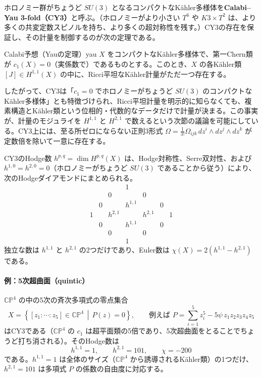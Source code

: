\documentclass[uplatex, dvipdfmx, book]{jsbook}
\begin{document}
ホロノミー群がちょうど $SU(3)$ となるコンパクトなK\"ahler多様体を\textbf{Calabi--Yau 3-fold（CY3）}と呼ぶ。（ホロノミーがより小さい $T^6$ や $K3 \times T^2$ は、より多くの共変定数スピノルを持ち、より多くの超対称性を残す。）CY3の存在を保証し、その計量を制御するのが次の定理である\cite{yau1978}。

\begin{mythm}{Calabi予想（Yauの定理）}{yau}
$X$ をコンパクトなK\"ahler多様体で、第一Chern類が $c_1(X) = 0$（実係数で）であるものとする。このとき、$X$ の各K\"ahler類 $[J] \in H^{1,1}(X)$ の中に、Ricci平坦なK\"ahler計量がただ一つ存在する。
\end{mythm}

したがって、CY3は「$c_1 = 0$ でホロノミーがちょうど $SU(3)$ のコンパクトなK\"ahler多様体」とも特徴づけられ、Ricci平坦計量を明示的に知らなくても、複素構造とK\"ahler類という位相的・代数的なデータだけで計量が決まる。この事実が、計量のモジュライを $H^{1,1}$ と $H^{2,1}$ で数えるという次節の議論を可能にしている。CY3上には、至る所ゼロにならない正則3形式 $\Omega = \frac{1}{3!}\Omega_{ijk}\, dz^i \wedge dz^j \wedge dz^k$ が定数倍を除いて一意に存在する。

CY3のHodge数 $h^{p,q} = \dim H^{p,q}(X)$ は、Hodge対称性、Serre双対性、および $h^{1,0} = h^{2,0} = 0$（ホロノミーがちょうど $SU(3)$ であることから従う）により、次のHodgeダイアモンドにまとめられる。
\begin{equation}
\begin{array}{ccccccc}
 & & & 1 & & & \\
 & & 0 & & 0 & & \\
 & 0 & & h^{1,1} & & 0 & \\
 1 & & h^{2,1} & & h^{2,1} & & 1 \\
 & 0 & & h^{1,1} & & 0 & \\
 & & 0 & & 0 & & \\
 & & & 1 & & &
\end{array}
\end{equation}
独立な数は $h^{1,1}$ と $h^{2,1}$ の2つだけであり、Euler数は $\chi(X) = 2(h^{1,1} - h^{2,1})$ である。

\paragraph{例：5次超曲面（quintic）}
$\mathbb{CP}^4$ の中の5次の斉次多項式の零点集合
\begin{equation}
    X = \left\{ [z_1 : \cdots : z_5] \in \mathbb{CP}^4 \,\middle|\, P(z) = 0 \right\}, \qquad \text{例えば } P = \sum_{i=1}^5 z_i^5 - 5\psi\, z_1z_2z_3z_4z_5
\end{equation}
はCY3である（$\mathbb{CP}^4$ の $c_1$ は超平面類の5倍であり、5次超曲面をとることでちょうど打ち消される）。そのHodge数は
\begin{equation}
    h^{1,1} = 1, \qquad h^{2,1} = 101, \qquad \chi = -200
\end{equation}
である。$h^{1,1} = 1$ は全体のサイズ（$\mathbb{CP}^4$ から誘導されるK\"ahler類）の1つだけ、$h^{2,1} = 101$ は多項式 $P$ の係数の自由度に対応する。
\end{document}
